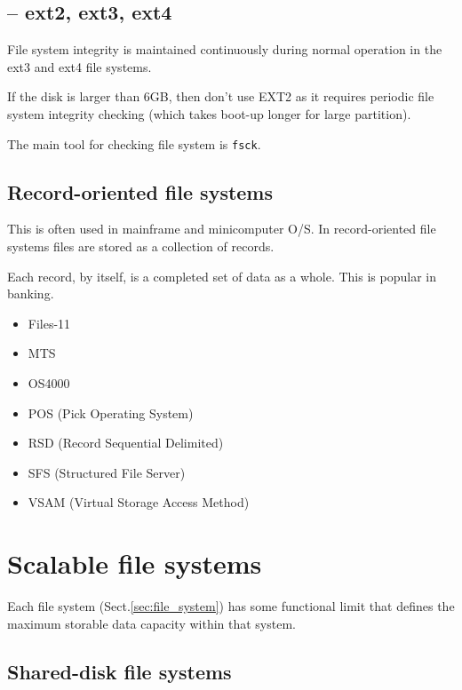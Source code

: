 \subsection{-- ext2, ext3, ext4}
\label{sec:EXT2}
\label{sec:EXT3}
\label{sec:EXT4}

File system integrity is maintained continuously during normal operation in the
ext3 and ext4 file systems.

If the disk is larger than 6GB, then don't use EXT2 as it requires periodic file
system integrity checking (which takes boot-up longer for large partition). 

The main tool for checking file system is \verb!fsck!.



\subsection{Record-oriented file systems}
\label{sec:filesystem_record-oriented}

This is often used in mainframe and minicomputer O/S. In record-oriented file
systems files are stored as a collection of records.

Each record, by itself, is a completed set of data as a whole. This is popular
in banking.

\begin{itemize}
  \item Files-11
  \item MTS
  \item OS4000
  \item POS (Pick Operating System)
  \item RSD (Record Sequential Delimited)
  \item SFS (Structured File Server)
  \item VSAM (Virtual Storage Access Method)
\end{itemize}



\section{Scalable file systems}
\label{sec:filesystem-scalable}

Each file system (Sect.\ref{sec:file_system}) has some functional limit that
defines the maximum storable data capacity within that system.

\subsection{Shared-disk file systems}
\label{sec:filesystem-scalable-shared-disk}

